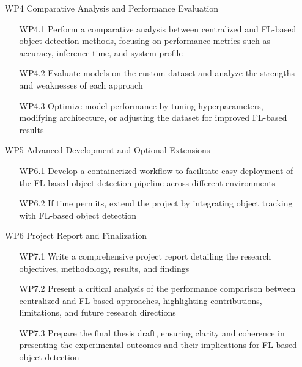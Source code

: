 \documentclass[thesis]{mas_proposal}
\begin{document}
\begin{enumerate}
      \item[WP4] Comparative Analysis and Performance Evaluation
            \begin{itemize}
                  \item[WP4.1] Perform a comparative analysis between centralized and FL-based object detection methods, focusing on performance metrics such as accuracy, inference time, and system profile
                  \item[WP4.2] Evaluate models on the custom dataset and analyze the strengths and weaknesses of each approach
                  \item[WP4.3] Optimize model performance by tuning hyperparameters, modifying architecture, or adjusting the dataset for improved FL-based results
            \end{itemize}


      \item[WP5] Advanced Development and Optional Extensions
            \begin{itemize}
                  \item[WP6.1] Develop a containerized workflow to facilitate easy deployment of the FL-based object detection pipeline across different environments
                  \item[WP6.2] If time permits, extend the project by integrating object tracking with FL-based object detection
            \end{itemize}

      \item[WP6] Project Report and Finalization
            \begin{itemize}
                  \item[WP7.1] Write a comprehensive project report detailing the research objectives, methodology, results, and findings
                  \item[WP7.2] Present a critical analysis of the performance comparison between centralized and FL-based approaches, highlighting contributions, limitations, and future research directions
                  \item[WP7.3] Prepare the final thesis draft, ensuring clarity and coherence in presenting the experimental outcomes and their implications for FL-based object detection
            \end{itemize}


\end{enumerate}
\end{document}
